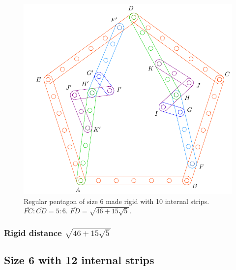 \documentclass[11pt]{article}
\begin{document}
\begin{figure}[H]
\centering
\includegraphics[scale=0.7]{6/penta6-10a}
\caption{Regular pentagon of size 6 made rigid with 10 internal strips. $\overline{FC} : \overline{CD} = 5:6$. $\overline{FD} = \sqrt{46 + 15\sqrt5}$.}
\label{fig:penta6-10a}
\end{figure}

\subsubsection{Rigid distance $\sqrt{46 + 15\sqrt5}$}

\subsection{Size 6 with 12 internal strips}
\end{document}

